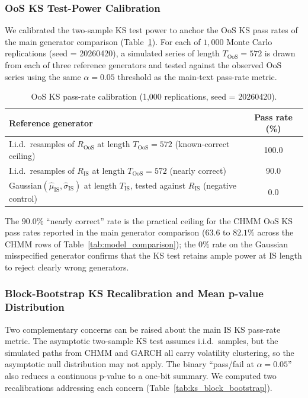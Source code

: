 \subsubsection{OoS KS Test-Power Calibration}
\label{sec:ks_power}

We calibrated the two-sample KS test power to anchor the OoS KS pass rates of the main generator comparison (Table~\ref{tab:ks_power}).
For each of $1{,}000$ Monte Carlo replications (seed = 20260420), a simulated series of length $T_{\text{OoS}} = 572$ is drawn from each of three reference generators and tested against the observed OoS series using the same $\alpha = 0.05$ threshold as the main-text pass-rate metric.

\begin{table}[!ht]
\centering
\small
\caption{OoS KS pass-rate calibration (1{,}000 replications, seed = 20260420).}
\label{tab:ks_power}
\begin{tabular}{l c}
\toprule
Reference generator & Pass rate (\%) \\
\midrule
I.i.d.\ resamples of $R_{\text{OoS}}$ at length $T_{\text{OoS}} = 572$ (known-correct ceiling) & 100.0 \\
I.i.d.\ resamples of $R_{\text{IS}}$ at length $T_{\text{OoS}} = 572$ (nearly correct)          & 90.0  \\
Gaussian$(\hat\mu_{\text{IS}}, \hat\sigma_{\text{IS}})$ at length $T_{\text{IS}}$, tested against $R_{\text{IS}}$ (negative control) & 0.0 \\
\bottomrule
\end{tabular}
\end{table}

The $90.0\%$ ``nearly correct'' rate is the practical ceiling for the CHMM OoS KS pass rates reported in the main generator comparison ($63.6$ to $82.1\%$ across the CHMM rows of Table~\ref{tab:model_comparison}); the $0\%$ rate on the Gaussian misspecified generator confirms that the KS test retains ample power at IS length to reject clearly wrong generators.

\subsubsection{Block-Bootstrap KS Recalibration and Mean p-value Distribution}
\label{sec:ks_block_bootstrap}

Two complementary concerns can be raised about the main IS KS pass-rate metric. The asymptotic two-sample KS test assumes i.i.d.\ samples, but the simulated paths from CHMM and GARCH all carry volatility clustering, so the asymptotic null distribution may not apply. The binary ``pass/fail at $\alpha = 0.05$'' also reduces a continuous p-value to a one-bit summary. We computed two recalibrations addressing each concern (Table~\ref{tab:ks_block_bootstrap}).

